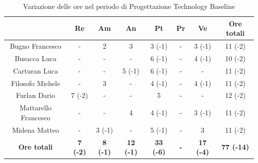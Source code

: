 \begin{table}[H]
  \centering
  \renewcommand{\arraystretch}{1.8}
  \begin{tabular}{c|c|c|c|c|c|c|c}
    \rowcolor[HTML]{125E28}
    \multicolumn{1}{c}{\color[HTML]{FFFFFF}\textbf{ Nominativo }}
                         & \multicolumn{1}{c}{\color[HTML]{FFFFFF}\textbf{ Re }}
                         & \multicolumn{1}{c}{\color[HTML]{FFFFFF}\textbf{ Am}}
                         & \multicolumn{1}{c}{\color[HTML]{FFFFFF}\textbf{ An }}
                         & \multicolumn{1}{c}{\color[HTML]{FFFFFF}\textbf{ Pt }}
                         & \multicolumn{1}{c}{\color[HTML]{FFFFFF}\textbf{ Pr }}
                         & \multicolumn{1}{c}{\color[HTML]{FFFFFF}\textbf{ Ve }}
                         & \multicolumn{1}{c}{\color[HTML]{FFFFFF}\textbf{ Ore totali }}                                                                                                             \\
    \hline
    Bugno Francesco      & -                                                             & 2               & 3                & 3 (-1)           & -          & 3 (-1)           & 11 (-2)           \\
    Busacca Luca         & -                                                             & -               & -                & 6 (-1)           & -          & 4 (-1)           & 10 (-2)           \\
    Carturan Luca        & -                                                             & -               & 5 (-1)           & 6 (-1)           & -          & -                & 11 (-2)           \\
    Filosofo Michele     & -                                                             & 3               & -                & 4 (-1)           & -          & 4 (-1)           & 11 (-2)           \\
    Furlan Dario         & 7 (-2)                                                        & -               & -                & 5                & -          & -                & 12 (-2)           \\
    Mattarello Francesco & -                                                             & -               & 4                & 4 (-1)           & -          & 3 (-1)           & 11 (-2)           \\
    Midena Matteo        & -                                                             & 3 (-1)          & -                & 5 (-1)           & -          & 3                & 11 (-2)           \\
    \textbf{Ore totali}  & \textbf{7 (-2)}                                               & \textbf{8 (-1)} & \textbf{12 (-1)} & \textbf{33 (-6)} & \textbf{-} & \textbf{17 (-4)} & \textbf{77 (-14)}
  \end{tabular}
  \caption{Variazione delle ore nel periodo di Progettazione Technology Baseline}
\end{table}

